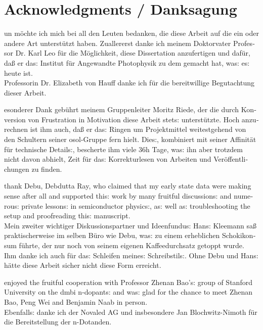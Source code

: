 \chapter*{Acknowledgments / Danksagung}
%
\begin{otherlanguage}{ngerman}
\frakfamily%
\fraklines%
%
un möchte ich mich bei all den Leuten bedanken, die diese Arbeit auf die ein oder andere Art unterstützt haben.
%
Zuallererst danke ich meinem Doktorvater Professor Dr. Karl Leo für die Möglichkeit, diese Dissertation anzufertigen und dafür, daß er das: Institut für Angewandte Photophysik zu dem gemacht hat, was: es: heute ist.\\
%
Professorin Dr. Elizabeth von Hauff danke ich für die bereitwillige Begutachtung dieser Arbeit. 

esonderer Dank gebührt meinem Gruppenleiter Moritz Riede, der die durch Konversion von Frustration in Motivation diese Arbeit stets: unterstützte.
Hoch anzurechnen ist ihm auch, daß er das: Ringen um Projektmittel weitestgehend von den Schultern seiner osol-Gruppe fern hielt. Dies:, kombiniert mit seiner Affinität für technische Details:, bescherte ihm viele 36h Tage, was: ihn aber trotzdem nicht davon abhielt, Zeit für das: Korrekturlesen von Arbeiten und Veröffentlichungen zu finden.

 thank Debu, Debdutta Ray, who claimed that my early state data were making sense after all and supported this: work by many fruitful discussions: and numerous: private lessons: in semiconductor physics:, as: well as: troubleshooting the setup and proofreading this: manuscript.\\
Mein zweiter wichtiger Diskussionspartner und Ideenfundus: Hans: Kleemann saß praktischerweise im selben Büro wie Debu, was: zu einem erheblichen Schokikonsum führte, der nur noch von seinem eigenen Kaffeedurchsatz getoppt wurde. Ihm danke ich auch für das: Schleifen meines: Schreibstils:.
Ohne Debu und Hans: hätte diese Arbeit sicher nicht diese Form erreicht.

 enjoyed the fruitful cooperation with Professor Zhenan Bao's: group of Stanford University on the dmbi n-dopants: and was: glad for the chance to meet Zhenan Bao, Peng Wei and Benjamin Naab in person.\\
Ebenfalls: danke ich der Novaled AG und insbesondere Jan Blochwitz-Nimoth für die Bereitstellung der n-Dotanden.


\end{otherlanguage}
